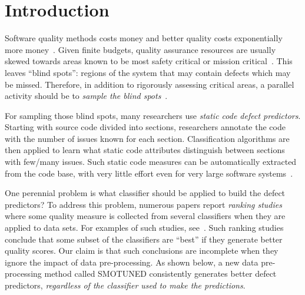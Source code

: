 \documentclass[10pt,conference]{IEEEtran}
\theoremstyle{break}
\theoremstyle{break}
\begin{document}
\IEEEpeerreviewmaketitle


\section{Introduction}
Software quality methods    costs money and better quality costs exponentially more money~\cite{voas95,fu2016tuning}.  
Given finite budgets, quality assurance resources are usually 
skewed towards areas known to be most safety critical or mission critical~\cite{lowryBK98}. This leaves ``blind spots'': regions of the system that may contain defects which may be missed. Therefore, in addition to rigorously assessing  critical areas, a parallel activity should be to {\em sample the blind spots}~\cite{Menzies04}. 

For sampling those blind spots, many researchers  use  {\em static code defect predictors}.
Starting with source code divided into sections, researchers annotate the code with the number of issues known for each section.
Classification algorithms are then applied to learn what static code attributes
distinguish 
between sections with few/many issues.
Such static code measures can be automatically extracted from
the code base, with very little effort even for very large software
systems~\cite{Nagappan:2005}.  


One perennial problem   is what classifier should be applied to build the defect predictors?
To address this problem, numerous papers report {\em ranking studies} where
some quality measure  is collected from  several  classifiers when they are 
 applied to data sets.
For examples of such studies,
see~\cite{lessmann2008benchmarking,hall2012systematic,elish2008predicting,menzies2010defect,gondra2008applying,radjenovic2013software,jiang2008techniques,wang2013using,mende2009revisiting,li2012sample,khoshgoftaar2010attribute,jiang2009variance,ghotra2015revisiting,jiang2008can,tantithamthavorn2016automated,fu2016tuning}.
Such ranking studies conclude that some subset of the classifiers
are  ``best'' if they generate  better quality scores.
Our claim is that such conclusions are incomplete when
they ignore the impact of  
data pre-processing. As shown below,
a new data pre-processing method called SMOTUNED
 consistently generates better 
defect predictors,
{\em regardless of the classifier used
to make the predictions}.  
\end{document}
